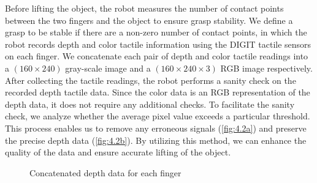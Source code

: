 \documentclass[12pt, a4paper]{report}
\theoremstyle{definition}
\begin{document}
Before lifting the object, the robot measures the number of contact points between the two fingers and the object to ensure grasp stability. We define a grasp to be stable if there are a non-zero number of contact points, in which the robot records depth and color tactile information using the DIGIT tactile sensors on each finger. We concatenate each pair of depth and color tactile readings into a $(160\times240)$ gray-scale image and a $(160\times240\times3)$ RGB image respectively.\\

After collecting the tactile readings, the robot performs a sanity check on the recorded depth tactile data. Since the color data is an RGB representation of the depth data, it does not require any additional checks. To facilitate the sanity check, we analyze whether the average pixel value exceeds a particular threshold. This process enables us to remove any erroneous signals (\ref{fig:4.2a}) and preserve the precise depth data (\ref{fig:4.2b}). By utilizing this method, we can enhance the quality of the data and ensure accurate lifting of the object.

\begin{figure}[H]%
    \centering
    \qquad
    \caption{Concatenated depth data for each finger}%
    \label{fig:4.2}%
\end{figure}
\end{document}
